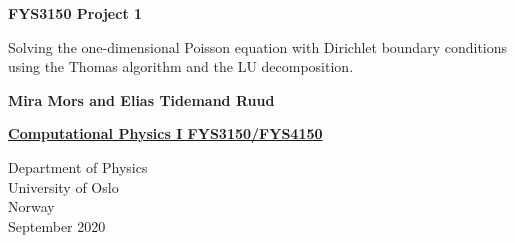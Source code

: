 \begin{titlepage}
   \begin{center}
       \vspace*{1cm}
       \LARGE\textbf{FYS3150 Project 1}
\end{center}
\begin{center}

       \vspace{0.5cm}
        Solving the one-dimensional Poisson equation with Dirichlet boundary conditions using the Thomas algorithm and the LU decomposition. 
            
       \vspace{1.5cm}

       \textbf{Mira Mors and Elias Tidemand Ruud}

       \vfill
            
      {\bf \href{{http://www.uio.no/studier/emner/matnat/fys/FYS3150/index-eng.html}}{Computational Physics I FYS3150/FYS4150}} 
            
       \vspace{0.8cm}
     
            
       Department of Physics\\
       University of Oslo\\
       Norway\\
       September 2020
            
   \end{center}
\end{titlepage}




